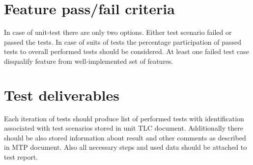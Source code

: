 \section{Feature pass/fail criteria} \label{s:details-of-the-level-test-design:feature-pass-fail-criteria}
	\begin{comment}
		Specify the criteria to be used to determine whether the feature or feature combination has passed or
		failed. This is commonly based on the number of anomalies found in each severity category(s). This
		section is not needed if it is covered by an MTP and there have been no subsequent changes to the
		criteria.
	\end{comment}
	In case of unit-test there are only two options. Either test scenario failed or passed the tests. In case of suits of tests the percentage participation of passed tests to overall performed tests should be considered. At least one failed test case disqualify feature from well-implemented set of features.
\section{Test deliverables} \label{s:details-of-the-level-test-design:test-deliverables}
	\begin{comment}
		Identify all information that is to be delivered by the test activity (documents, data, etc.). The following
		documents may be included:
		⎯ Level Test Plan(s)
		⎯ Level Test Design(s)
		⎯ Level Test Cases
		⎯ Level Test Procedures
		⎯ Level Test Logs
		⎯ Anomaly Reports
		⎯ Level Interim Test Status Report(s)
		⎯ Level Test Report(s)
		⎯ Master Test Report
		Test input data and test output data may be identified as deliverables. Test tools may also be included.
		If documents have been combined or eliminated, then this list will be modified accordingly.
		Describe the process of delivering the completed information to the individuals (preferably by position,
		not name) and organizational entities that will need it. This may be a reference to a Configuration
		Management Plan. This delivery process description is not required if it is covered by the MTP and
		there are no changes
	\end{comment}
	Each iteration of tests should produce list of performed tests with identification associated with test scenarios stored in unit \gls{TLC} document. Additionally there should be also stored information about result and other comments as described in \gls{MTP} document. Also all necessary steps and used data should be attached to test report.